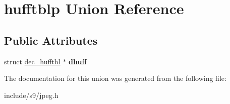 \hypertarget{unionhufftblp}{\section{hufftblp \-Union \-Reference}
\label{unionhufftblp}
}
\subsection*{\-Public \-Attributes}
\begin{DoxyCompactItemize}
\item 
\hypertarget{unionhufftblp_a5b28307fa2aee035f813db499a48dfe4}{struct \hyperlink{structdec__hufftbl}{dec\-\_\-hufftbl} $\ast$ {\bfseries dhuff}}\label{unionhufftblp_a5b28307fa2aee035f813db499a48dfe4}

\end{DoxyCompactItemize}


\-The documentation for this union was generated from the following file\-:\begin{DoxyCompactItemize}
\item 
include/s9/jpeg.\-h\end{DoxyCompactItemize}
